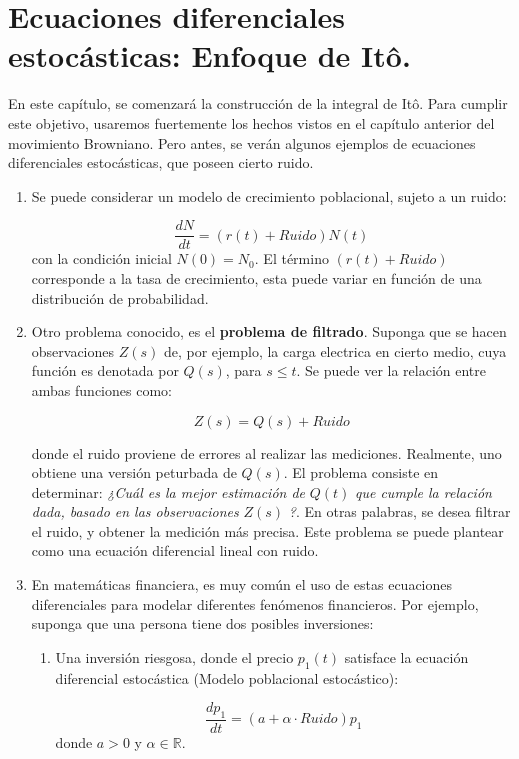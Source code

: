 \chapter{Ecuaciones diferenciales estocásticas: Enfoque de Itô.}

En este capítulo, se comenzará la construcción de la integral de Itô. Para cumplir este objetivo, usaremos fuertemente los hechos vistos en el capítulo anterior del movimiento Browniano. Pero antes, se verán algunos ejemplos de ecuaciones diferenciales estocásticas, que poseen cierto ruido.

\begin{enumerate}
	\item Se puede considerar un modelo de crecimiento poblacional, sujeto a un ruido:

	\[
		\frac{dN}{dt} = (r(t) + \textit{Ruido})N(t)
	\] 
	con la condición inicial $N(0) = N_0$. El término $(r(t) + \textit{Ruido})$ corresponde a la tasa de crecimiento, esta puede variar en función de una distribución de probabilidad.

	\item Otro problema conocido, es el \textbf{problema de filtrado}. Suponga que se hacen observaciones $Z(s)$ de, por ejemplo, la carga electrica en cierto medio, cuya función es denotada por $Q(s)$, para $s \leq t$. Se puede ver la relación entre ambas funciones como:

	\[
		Z(s) = Q(s) + \textit{Ruido}	
	\]

	donde el ruido proviene de errores al realizar las mediciones. Realmente, uno obtiene una versión peturbada de $Q(s)$. El problema consiste en determinar: \textit{¿Cuál es la mejor estimación de} $Q(t)$ \textit{que cumple la relación dada, basado en las observaciones} $Z(s)$ \textit{?}. En otras palabras, se desea filtrar el ruido, y obtener la medición más precisa. Este problema se puede plantear como una ecuación diferencial lineal con ruido.

	\item En matemáticas financiera, es muy común el uso de estas ecuaciones diferenciales para modelar diferentes fenómenos financieros. Por ejemplo, suponga que una persona tiene dos posibles inversiones:

	\begin{enumerate}
		\item Una inversión riesgosa, donde el precio $p_1 (t)$ satisface la ecuación diferencial estocástica (Modelo poblacional estocástico):

		\[
			\frac{dp_1}{dt} = (a + \alpha \cdot \textit{Ruido})p_1
		\]
		donde $a > 0$ y $\alpha \in \mathbb{R}$.


\end{enumerate}
\end{enumerate}
